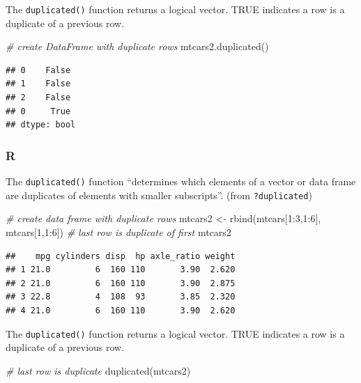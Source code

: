 \documentclass[
]{book}
\newenvironment{Shaded}{\begin{snugshade}}{\end{snugshade}}
\newcommand{\CommentTok}[1]{\textcolor[rgb]{0.56,0.35,0.01}{\textit{#1}}}
\newcommand{\DecValTok}[1]{\textcolor[rgb]{0.00,0.00,0.81}{#1}}
\newcommand{\FunctionTok}[1]{\textcolor[rgb]{0.00,0.00,0.00}{#1}}
\newcommand{\NormalTok}[1]{#1}
\newcommand{\OtherTok}[1]{\textcolor[rgb]{0.56,0.35,0.01}{#1}}
\newcommand{\SpecialCharTok}[1]{\textcolor[rgb]{0.00,0.00,0.00}{#1}}
\begin{document}
The \texttt{duplicated()} function returns a logical vector. TRUE indicates a row is a duplicate of a previous row.

\begin{Shaded}
\begin{Highlighting}[]
\CommentTok{\# create DataFrame with duplicate rows}
\NormalTok{mtcars2.duplicated()}
\end{Highlighting}
\end{Shaded}

\begin{verbatim}
## 0    False
## 1    False
## 2    False
## 0     True
## dtype: bool
\end{verbatim}

\hypertarget{r-27}{%
\subsubsection*{R}\label{r-27}}

The \texttt{duplicated()} function ``determines which elements of a vector or data frame are duplicates of elements with smaller subscripts''. (from \texttt{?duplicated})

\begin{Shaded}
\begin{Highlighting}[]
\CommentTok{\# create data frame with duplicate rows}
\NormalTok{mtcars2 }\OtherTok{\textless{}{-}} \FunctionTok{rbind}\NormalTok{(mtcars[}\DecValTok{1}\SpecialCharTok{:}\DecValTok{3}\NormalTok{,}\DecValTok{1}\SpecialCharTok{:}\DecValTok{6}\NormalTok{], mtcars[}\DecValTok{1}\NormalTok{,}\DecValTok{1}\SpecialCharTok{:}\DecValTok{6}\NormalTok{])}
\CommentTok{\# last row is duplicate of first}
\NormalTok{mtcars2}
\end{Highlighting}
\end{Shaded}

\begin{verbatim}
##    mpg cylinders disp  hp axle_ratio weight
## 1 21.0         6  160 110       3.90  2.620
## 2 21.0         6  160 110       3.90  2.875
## 3 22.8         4  108  93       3.85  2.320
## 4 21.0         6  160 110       3.90  2.620
\end{verbatim}

The \texttt{duplicated()} function returns a logical vector. TRUE indicates a row is a duplicate of a previous row.

\begin{Shaded}
\begin{Highlighting}[]
\CommentTok{\# last row is duplicate}
\FunctionTok{duplicated}\NormalTok{(mtcars2)}
\end{Highlighting}
\end{Shaded}
\end{document}
